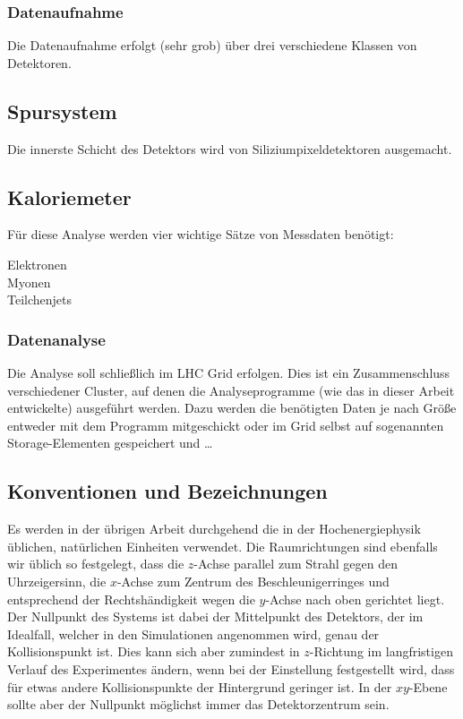 \subsubsection{Datenaufnahme}
\label{cha:aufnahme}
Die Datenaufnahme erfolgt (sehr grob) über drei verschiedene Klassen von
Detektoren.

\subsection{Spursystem}
Die innerste Schicht des Detektors wird von Siliziumpixeldetektoren ausgemacht.

\subsection{Kaloriemeter}

Für diese Analyse werden vier wichtige Sätze von Messdaten benötigt:
\begin{description}
  \item[Elektronen] %
  \item[Myonen] %
  \item[Teilchenjets] %
\end{description}
\subsubsection{Datenanalyse}
Die Analyse soll schließlich im LHC Grid erfolgen. Dies ist ein Zusammenschluss
verschiedener Cluster, auf denen die Analyseprogramme (wie das in dieser Arbeit
entwickelte) ausgeführt werden. Dazu werden die benötigten Daten je nach Größe
entweder mit dem Programm mitgeschickt oder im Grid selbst auf sogenannten
Storage-Elementen gespeichert und \dots

\subsection{Konventionen und Bezeichnungen}
\label{cha:conv}
Es werden in der übrigen Arbeit durchgehend die in der Hochenergiephysik
üblichen, natürlichen Einheiten verwendet. Die Raumrichtungen sind ebenfalls wir
üblich so festgelegt, dass die $z$-Achse parallel zum Strahl gegen den
Uhrzeigersinn, die $x$-Achse zum Zentrum des Beschleunigerringes und
entsprechend der Rechtshändigkeit wegen die $y$-Achse nach oben gerichtet liegt.
Der Nullpunkt des Systems ist dabei der Mittelpunkt des Detektors, der im
Idealfall, welcher in den Simulationen angenommen wird, genau der
Kollisionspunkt ist.  Dies kann sich aber zumindest in $z$-Richtung im
langfristigen Verlauf des Experimentes ändern, wenn bei der Einstellung
festgestellt wird, dass für etwas andere Kollisionspunkte der Hintergrund
geringer ist. In der $xy$-Ebene sollte aber der Nullpunkt möglichst immer das
Detektorzentrum sein.

